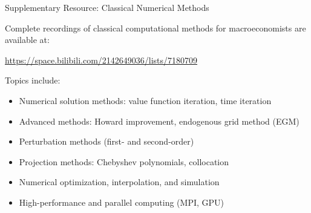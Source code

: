 \begin{frame}{Supplementary Resource: Classical Numerical Methods}
\begin{tcolorbox}[colback=blue!3, colframe=blue!40, title=Video Lecture Series]
Complete recordings of classical computational methods for macroeconomists are available at:
\begin{center}
\url{https://space.bilibili.com/2142649036/lists/7180709}
\end{center}
\medskip
Topics include:
\begin{itemize}
  \item Numerical solution methods: value function iteration, time iteration
  \item Advanced methods: Howard improvement, endogenous grid method (EGM)
  \item Perturbation methods (first- and second-order)
  \item Projection methods: Chebyshev polynomials, collocation
  \item Numerical optimization, interpolation, and simulation
  \item High-performance and parallel computing (MPI, GPU)
\end{itemize}
\end{tcolorbox}
\end{frame}


